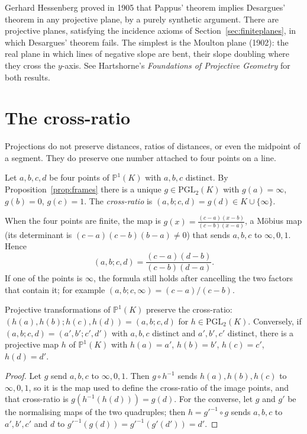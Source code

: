 \begin{remark}
Gerhard Hessenberg proved in 1905 that Pappus' theorem implies Desargues' theorem in any projective plane, by a purely synthetic argument.
There are projective planes, satisfying the incidence axioms of Section~\ref{sec:finiteplanes}, in which Desargues' theorem fails. The simplest is
the Moulton plane (1902): the real plane in which lines of negative slope are bent, their slope doubling where they cross the $y$-axis. See
Hartshorne's \emph{Foundations of Projective Geometry} for both results.
\end{remark}

\section{The cross-ratio}

Projections do not preserve distances, ratios of distances, or even the midpoint of a segment. They do preserve one number attached to four
points on a line.

\begin{definition}\label{def:crossratio}
Let $a,b,c,d$ be four points of $\mathbb P^1(K)$ with $a,b,c$ distinct. By Proposition~\ref{prop:frames} there is a unique $g\in\mathrm{PGL}_2(K)$
with $g(a)=\infty$, $g(b)=0$, $g(c)=1$. The \emph{cross-ratio} is $(a,b;c,d)=g(d)\in K\cup\{\infty\}$.
\end{definition}

When the four points are finite, the map is $g(x)=\frac{(c-a)(x-b)}{(c-b)(x-a)}$, a M\"obius map (its determinant is $(c-a)(c-b)(b-a)\ne0$) that
sends $a,b,c$ to $\infty,0,1$. Hence
\begin{equation}\label{eq:crossratio}
(a,b;c,d)=\frac{(c-a)(d-b)}{(c-b)(d-a)}.
\end{equation}
If one of the points is $\infty$, the formula still holds after cancelling the two factors that contain it; for example $(a,b;c,\infty)=(c-a)/(c-b)$.

\begin{theorem}\label{thm:crossratio}
Projective transformations of $\mathbb P^1(K)$ preserve the cross-ratio: $(h(a),h(b);h(c),h(d))=(a,b;c,d)$ for $h\in\mathrm{PGL}_2(K)$.
Conversely, if $(a,b;c,d)=(a',b';c',d')$ with $a,b,c$ distinct and $a',b',c'$ distinct, there is a projective map $h$ of $\mathbb P^1(K)$ with $h(a)=a'$,
$h(b)=b'$, $h(c)=c'$, $h(d)=d'$.
\end{theorem}

\begin{proof}
Let $g$ send $a,b,c$ to $\infty,0,1$. Then $g\circ h^{-1}$ sends $h(a),h(b),h(c)$ to $\infty,0,1$, so it is the map used to define the cross-ratio of
the image points, and that cross-ratio is $g(h^{-1}(h(d)))=g(d)$. For the converse, let $g$ and $g'$ be the normalising maps of the two
quadruples; then $h=g'^{-1}\circ g$ sends $a,b,c$ to $a',b',c'$ and $d$ to $g'^{-1}(g(d))=g'^{-1}(g'(d'))=d'$.
\end{proof}

